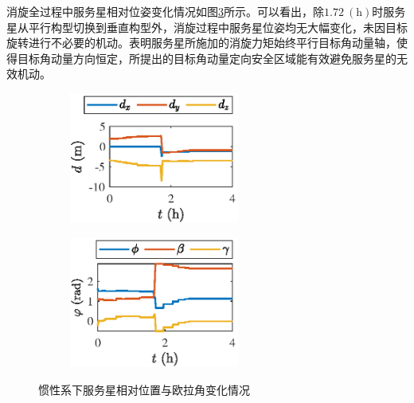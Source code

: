 \documentclass[lang=chs, degree=master, blindreview=false, winfonts=true]{yanputhesis}
\begin{document}
消旋全过程中服务星相对位姿变化情况如图\ref{Fig.detumble_posiandpose}所示。可以看出，除$1.72\ (\mathrm{h})$时服务星从平行构型切换到垂直构型外，消旋过程中服务星位姿均无大幅变化，未因目标旋转进行不必要的机动。表明服务星所施加的消旋力矩始终平行目标角动量轴，使得目标角动量方向恒定，所提出的目标角动量定向安全区域能有效避免服务星的无效机动。
\begin{figure}[htb!]
	\centering
	\begin{minipage}[t]{0.96\textwidth}
		\centering
		\begin{subfigure}[t]{0.47\textwidth}
			\centering
			\includegraphics[width = 2.2in]{picture/detumble_posi.eps}
			\caption{ }
			\label{fig:detumbleposi}
		\end{subfigure}\hfill
		\begin{subfigure}[t]{0.47\textwidth}
			\centering
			\includegraphics[width = 2.2in]{picture/detumble_pose.eps}
			\caption{ }
			\label{fig:detumblepose}
		\end{subfigure}
	\end{minipage}
	\caption{惯性系下服务星相对位置与欧拉角变化情况\label{Fig.detumble_posiandpose}}
\end{figure}
\end{document}
